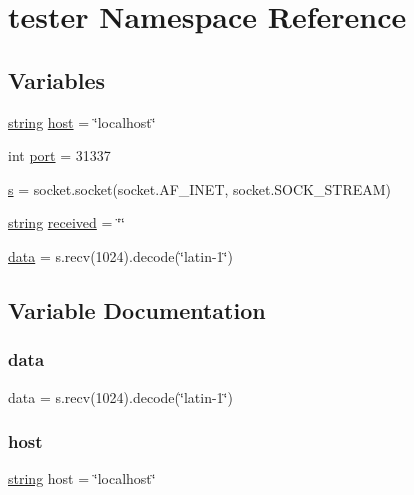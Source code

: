 \hypertarget{namespacetester}{}\section{tester Namespace Reference}
\label{namespacetester}
\subsection*{Variables}
\begin{DoxyCompactItemize}
\item 
\hyperlink{string_8h_a3d2981d9da3e25dd89371059777fdd12}{string} \hyperlink{namespacetester_a4b730861b8c2165bfeabd34968e25e37}{host} = \char`\"{}localhost\char`\"{}
\item 
int \hyperlink{namespacetester_a63c89c04d1feae07ca35558055155ffb}{port} = 31337
\item 
\hyperlink{namespacetester_a3691308f2a4c2f6983f2880d32e29c84}{s} = socket.\+socket(socket.\+A\+F\+\_\+\+I\+N\+ET, socket.\+S\+O\+C\+K\+\_\+\+S\+T\+R\+E\+AM)
\item 
\hyperlink{string_8h_a3d2981d9da3e25dd89371059777fdd12}{string} \hyperlink{namespacetester_afe46e2ba1d74c064ee6ff5021a505d2f}{received} = \char`\"{}\char`\"{}
\item 
\hyperlink{namespacetester_a511ae0b1c13f95e5f08f1a0dd3da3d93}{data} = s.\+recv(1024).decode(\char`\"{}latin-\/1\char`\"{})
\end{DoxyCompactItemize}


\subsection{Variable Documentation}
\mbox{\label{namespacetester_a511ae0b1c13f95e5f08f1a0dd3da3d93}} 
\subsubsection{\texorpdfstring{data}{data}}
{\footnotesize\ttfamily data = s.\+recv(1024).decode(\char`\"{}latin-\/1\char`\"{})}

\mbox{\label{namespacetester_a4b730861b8c2165bfeabd34968e25e37}} 
\subsubsection{\texorpdfstring{host}{host}}
{\footnotesize\ttfamily \hyperlink{string_8h_a3d2981d9da3e25dd89371059777fdd12}{string} host = \char`\"{}localhost\char`\"{}}

